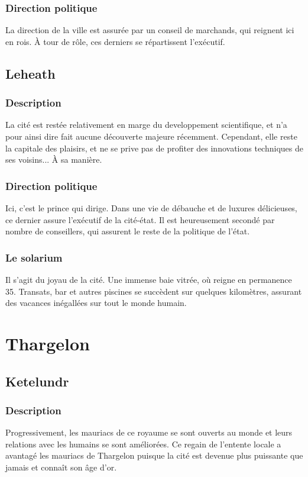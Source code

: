 \subsubsection{Direction politique}
La direction de la ville est assurée par un conseil de marchands, qui reignent ici en rois. À tour de rôle, ces derniers se répartissent l'exécutif.
\subsection{Leheath}
\subsubsection{Description}
La cité est restée relativement en marge du developpement scientifique, et n'a pour ainsi dire fait aucune découverte majeure récemment. Cependant, elle reste la capitale des plaisirs, et ne se prive pas de profiter des innovations techniques de ses voisins... À sa manière.
\subsubsection{Direction politique}
Ici, c'est le prince qui dirige. Dans une vie de débauche et de luxures délicieuses, ce dernier assure l'exécutif de la cité-état. Il est heureusement secondé par nombre de conseillers, qui assurent le reste de la politique de l'état.
\subsubsection{Le solarium}
Il s'agit du joyau de la cité. Une immense baie vitrée, où reigne en permanence 35\degre. Transats, bar et autres piscines se succèdent sur quelques kilomètres, assurant des vacances inégallées sur tout le monde humain.
\section{Thargelon}
\subsection{Ketelundr}
\subsubsection{Description}
Progressivement, les mauriacs de ce royaume se sont ouverts au monde et leurs relations avec les humains se sont améliorées. Ce regain de l'entente locale a avantagé les mauriacs de Thargelon puisque la cité est devenue plus puissante que jamais et connaît son âge d'or.
